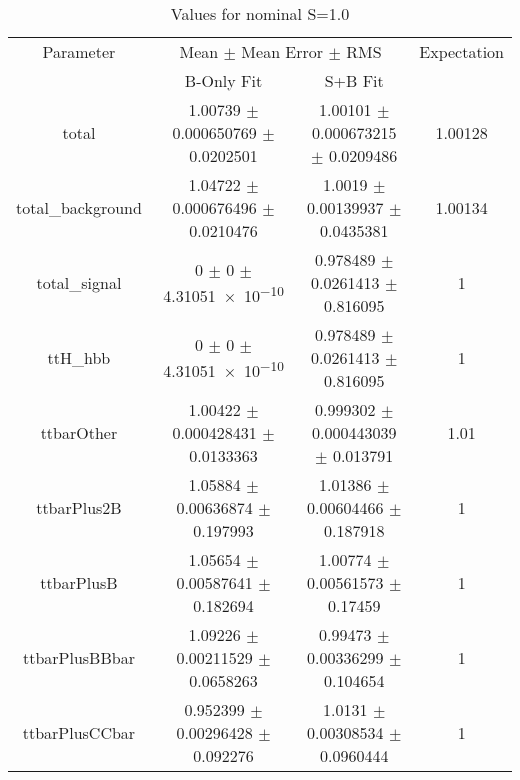 \begin{table}
\centering
\caption{Values for nominal S=1.0}
\begin{tabular}{cccc}
\toprule
Parameter & \multicolumn{2}{c}{Mean $\pm$ Mean Error $\pm$ RMS} & Expectation\\
 & B-Only Fit & S+B Fit & \\
\midrule
total & \num{1.00739} $\pm$ \num{0.000650769} $\pm$ \num{0.0202501} & \num{1.00101} $\pm$ \num{0.000673215} $\pm$ \num{0.0209486} & \num{1.00128}\\
total\_background & \num{1.04722} $\pm$ \num{0.000676496} $\pm$ \num{0.0210476} & \num{1.0019} $\pm$ \num{0.00139937} $\pm$ \num{0.0435381} & \num{1.00134}\\
total\_signal & \num{0} $\pm$ \num{0} $\pm$ \num{4.31051e-10} & \num{0.978489} $\pm$ \num{0.0261413} $\pm$ \num{0.816095} & \num{1}\\
ttH\_hbb & \num{0} $\pm$ \num{0} $\pm$ \num{4.31051e-10} & \num{0.978489} $\pm$ \num{0.0261413} $\pm$ \num{0.816095} & \num{1}\\
ttbarOther & \num{1.00422} $\pm$ \num{0.000428431} $\pm$ \num{0.0133363} & \num{0.999302} $\pm$ \num{0.000443039} $\pm$ \num{0.013791} & \num{1.01}\\
ttbarPlus2B & \num{1.05884} $\pm$ \num{0.00636874} $\pm$ \num{0.197993} & \num{1.01386} $\pm$ \num{0.00604466} $\pm$ \num{0.187918} & \num{1}\\
ttbarPlusB & \num{1.05654} $\pm$ \num{0.00587641} $\pm$ \num{0.182694} & \num{1.00774} $\pm$ \num{0.00561573} $\pm$ \num{0.17459} & \num{1}\\
ttbarPlusBBbar & \num{1.09226} $\pm$ \num{0.00211529} $\pm$ \num{0.0658263} & \num{0.99473} $\pm$ \num{0.00336299} $\pm$ \num{0.104654} & \num{1}\\
ttbarPlusCCbar & \num{0.952399} $\pm$ \num{0.00296428} $\pm$ \num{0.092276} & \num{1.0131} $\pm$ \num{0.00308534} $\pm$ \num{0.0960444} & \num{1}\\
\bottomrule
\end{tabular}
\end{table}